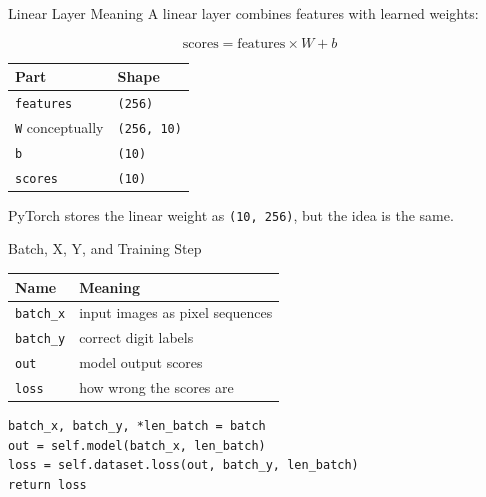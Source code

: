 \documentclass{beamer}
\begin{document}
\begin{frame}{Linear Layer Meaning}
\small
A linear layer combines features with learned weights:

\[
\text{scores} = \text{features} \times W + b
\]

\vspace{0.15cm}

\begin{center}
\begin{tabular}{l l}
\toprule
Part & Shape \\
\midrule
\texttt{features} & \texttt{(256)} \\
\texttt{W} conceptually & \texttt{(256, 10)} \\
\texttt{b} & \texttt{(10)} \\
\texttt{scores} & \texttt{(10)} \\
\bottomrule
\end{tabular}
\end{center}

PyTorch stores the linear weight as \texttt{(10, 256)}, but the idea is the same.
\end{frame}

\begin{frame}[fragile]{Batch, X, Y, and Training Step}
\small
\begin{center}
\begin{tabular}{l l}
\toprule
Name & Meaning \\
\midrule
\texttt{batch\_x} & input images as pixel sequences \\
\texttt{batch\_y} & correct digit labels \\
\texttt{out} & model output scores \\
\texttt{loss} & how wrong the scores are \\
\bottomrule
\end{tabular}
\end{center}

\vspace{0.15cm}

\begin{verbatim}
batch_x, batch_y, *len_batch = batch
out = self.model(batch_x, len_batch)
loss = self.dataset.loss(out, batch_y, len_batch)
return loss
\end{verbatim}
\end{frame}
\end{document}
